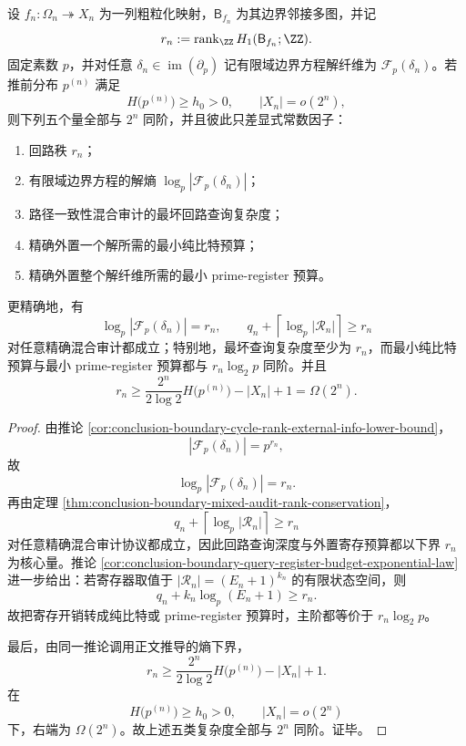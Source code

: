 \begin{theorem}[边界方程的五重复杂度同阶律]\label{thm:conclusion-boundary-fivefold-complexity-coscaling}
设 \(f_n:\Omega_n\twoheadrightarrow X_n\) 为一列粗粒化映射，\(\mathsf B_{f_n}\) 为其边界邻接多图，并记
\[
r_n:=\operatorname{rank}_{\ZZ}H_1(\mathsf B_{f_n};\ZZ).
\]
固定素数 \(p\)，并对任意 \(\delta_n\in\operatorname{im}(\partial_p)\) 记有限域边界方程解纤维为 \(\mathcal F_p(\delta_n)\)。若推前分布 \(p^{(n)}\) 满足
\[
H\bigl(p^{(n)}\bigr)\ge h_0>0,
\qquad
|X_n|=o(2^n),
\]
则下列五个量全部与 \(2^n\) 同阶，并且彼此只差显式常数因子：
\begin{enumerate}
  \item 回路秩 \(r_n\)；
  \item 有限域边界方程的解熵 \(\log_p|\mathcal F_p(\delta_n)|\)；
  \item 路径一致性混合审计的最坏回路查询复杂度；
  \item 精确外置一个解所需的最小纯比特预算；
  \item 精确外置整个解纤维所需的最小 prime-register 预算。
\end{enumerate}
更精确地，有
\[
\log_p|\mathcal F_p(\delta_n)|=r_n,
\qquad
q_n+\left\lceil \log_p |\mathcal R_n|\right\rceil \ge r_n
\]
对任意精确混合审计都成立；特别地，最坏查询复杂度至少为 \(r_n\)，而最小纯比特预算与最小 prime-register 预算都与 \(r_n\log_2 p\) 同阶。并且
\[
r_n\ge \frac{2^n}{2\log 2}H\bigl(p^{(n)}\bigr)-|X_n|+1=\Omega(2^n).
\]
\end{theorem}
\begin{proof}
由推论 \ref{cor:conclusion-boundary-cycle-rank-external-info-lower-bound}，
\[
|\mathcal F_p(\delta_n)|=p^{r_n},
\]
故
\[
\log_p|\mathcal F_p(\delta_n)|=r_n.
\]
再由定理 \ref{thm:conclusion-boundary-mixed-audit-rank-conservation}，
\[
q_n+\left\lceil \log_p |\mathcal R_n|\right\rceil \ge r_n
\]
对任意精确混合审计协议都成立，因此回路查询深度与外置寄存预算都以下界 \(r_n\) 为核心量。推论 \ref{cor:conclusion-boundary-query-register-budget-exponential-law} 进一步给出：若寄存器取值于 \(|\mathcal R_n|=(E_n+1)^{k_n}\) 的有限状态空间，则
\[
q_n+k_n\log_p(E_n+1)\ge r_n.
\]
故把寄存开销转成纯比特或 prime-register 预算时，主阶都等价于 \(r_n\log_2 p\)。

最后，由同一推论调用正文推导的熵下界，
\[
r_n\ge \frac{2^n}{2\log 2}H\bigl(p^{(n)}\bigr)-|X_n|+1.
\]
在
\[
H\bigl(p^{(n)}\bigr)\ge h_0>0,
\qquad
|X_n|=o(2^n)
\]
下，右端为 \(\Omega(2^n)\)。故上述五类复杂度全部与 \(2^n\) 同阶。证毕。
\end{proof}

